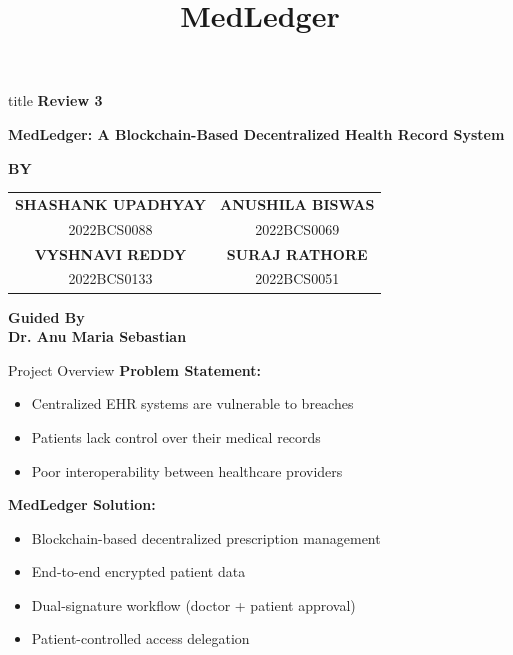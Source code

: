\documentclass[10pt]{beamer}
\title{MedLedger}
\author{}
\institute{}
\date{}
\begin{document}
\begin{frame}
\vfill
\begin{center}
\hspace{2cm}
\begin{beamercolorbox}[rounded=true,shadow=true,wd=0.9\textwidth,center,dp=0.5ex,ht=3ex]{title}
{\Large \textbf{Review 3}}
\end{beamercolorbox}

\vspace{0.5cm}
{\large \textbf{MedLedger: A Blockchain-Based Decentralized Health Record System}}

\vspace{0.8cm}

\textbf{BY}\\[0.5cm]
\begin{tabular}{cc}
\textbf{SHASHANK UPADHYAY} & \textbf{ANUSHILA BISWAS} \\
2022BCS0088 & 2022BCS0069 \\[0.3cm]
\textbf{VYSHNAVI REDDY} & \textbf{SURAJ RATHORE} \\
2022BCS0133 & 2022BCS0051
\end{tabular}

\vspace{0.8cm}

{\large \textbf{Guided By}}\\[0.2cm]
{\Large \textbf{Dr. Anu Maria Sebastian}}
\end{center}
\vfill
\end{frame}

\begin{frame}{Project Overview}
\textbf{Problem Statement:}
\begin{itemize}
\item Centralized EHR systems are vulnerable to breaches
\item Patients lack control over their medical records
\item Poor interoperability between healthcare providers
\end{itemize}

\vspace{0.3cm}
\textbf{MedLedger Solution:}
\begin{itemize}
\item Blockchain-based decentralized prescription management
\item End-to-end encrypted patient data
\item Dual-signature workflow (doctor + patient approval)
\item Patient-controlled access delegation
\end{itemize}
\end{frame}
\end{document}
